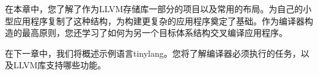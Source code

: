 在本章中，您了解了作为LLVM存储库一部分的项目以及常用的布局。为自己的小型应用程序复制了这种结构，为构建更复杂的应用程序奠定了基础。作为编译器构造的最高原则，您还学习了如何为另一个目标体系结构交叉编译应用程序。\par

在下一章中，我们将概述示例语言tinylang。您将了解编译器必须执行的任务，以及LLVM库支持哪些功能。\par

\newpage